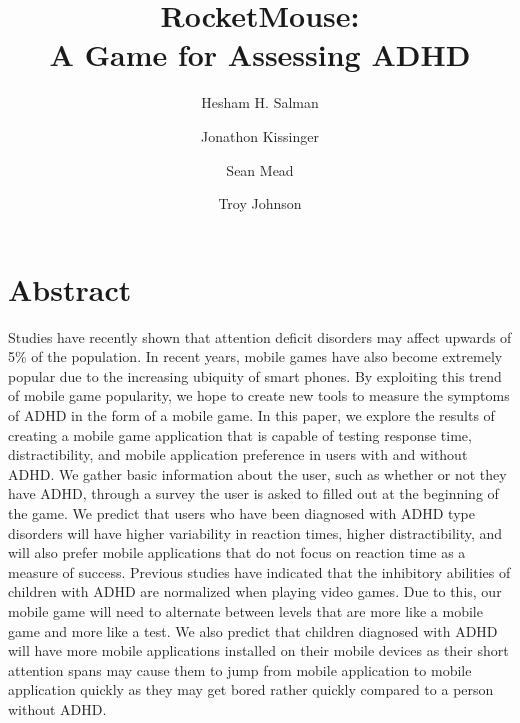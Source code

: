 \documentclass[a4wide]{article}
\title{RocketMouse:\\ A Game for Assessing ADHD}
\author{Hesham H. Salman \and Jonathon Kissinger \and Sean Mead \and Troy Johnson}
\begin{document}
\maketitle


\section{Abstract}
\- Studies have recently shown that attention deficit disorders may affect upwards of 5\% of the population. In recent years, mobile games have also become extremely popular due to the increasing ubiquity of smart phones. By exploiting this trend of mobile game popularity, we hope to create new tools to measure the symptoms of ADHD in the form of a mobile game. In this paper, we explore the results of creating a mobile game application that is capable of testing response time, distractibility, and mobile application preference in users with and without ADHD. We gather basic information about the user, such as whether or not they have ADHD, through a survey the user is asked to filled out at the beginning of the game. We predict that users who have been diagnosed with ADHD type disorders will have higher variability in reaction times, higher distractibility, and will also prefer mobile applications that do not focus on reaction time as a measure of success. Previous studies have indicated that the inhibitory abilities of children with ADHD are normalized when playing video games. Due to this, our mobile game will need to alternate between levels that are more like a mobile game and more like a test. We also predict that children diagnosed with ADHD will have more mobile applications installed on their mobile devices as their short attention spans may cause them to jump from mobile application to mobile application quickly as they may get bored rather quickly compared to a person without ADHD.
\end{document}
